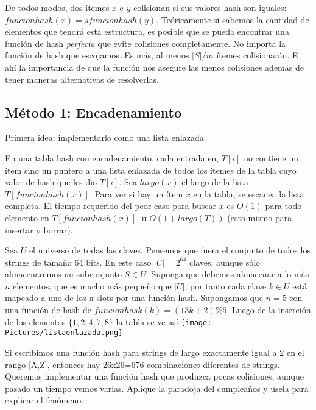 

De todos modos, dos ítemes $x$ e $y$ colisionan si sus valores hash son iguales: $funcionhash(x)=sfuncionhash(y)$. Teóricamente si sabemos la cantidad de elementos que tendrá esta estructura, es posible que se pueda encontrar una función de hash \textit{perfecta} que evite colisiones completamente. No importa la función de hash que escojamos. Es más, al menos $|S|/m$ ítemes colisionarán. E ahí la importancia de que la función nos asegure las menos colisiones además de tener maneras alternativas de resolverlas.




\subsection{Método 1: Encadenamiento}
Primera idea: implementarlo como una lista enlazada. 

En una tabla hash con encadenamiento, cada entrada en, $T[i]$ no contiene un ítem sino un puntero a una lista enlazada de todos los ítemes de la tabla cuyo valor de hash que les dio $T[i]$. Sea $largo(x)$ el largo de la lista $T[funcionhash(x)]$. Para ver si hay un ítem $x$ en la tabla, se escanea la lista completa. El tiempo requerido del peor caso para buscar $x$ es $O(1)$ para todo elemento en  $T[funcionhash(x)]$, u $O(1+largo(T))$ (esto mismo para insertar y borrar). 


Sea $U$ el universo de todas las claves. Pensemos que fuera el conjunto de todos los strings de tamaño 64 bits. En este caso $|U|=2^64$ claves, aunque sólo almacenaremos un subconjunto $S \in U$. Suponga que debemos almacenar a lo más $n$ elementos, que es mucho más pequeño que $|U|$, por tanto cada clave $k \in U$ está mapeado a uno de los n slots por una función hash. 
Supongamos que $n=5$ con una función de hash de $funcionhask(k)=(13k+2) \% 5$. Luego de la inserción de los elementos $\{1,2,4,7,8\}$ la tabla se ve así
\texttt{[image: Pictures/listaenlazada.png]}


\begin{tcolorbox}[colback=gray!5!white,colframe=orange!60!gray,title=Ejercicio] Si escribimos una función hash para strings de largo exactamente igual a 2 en el rango [A,Z], entonces hay 26x26=676 combinaciones diferentes  de strings. Queremos implementar una función hash que produzca pocas colisiones, aunque pasado un tiempo vemos varias. Aplique la paradoja del cumpleaños y úsela para explicar el fenómeno. 
\end{tcolorbox}

